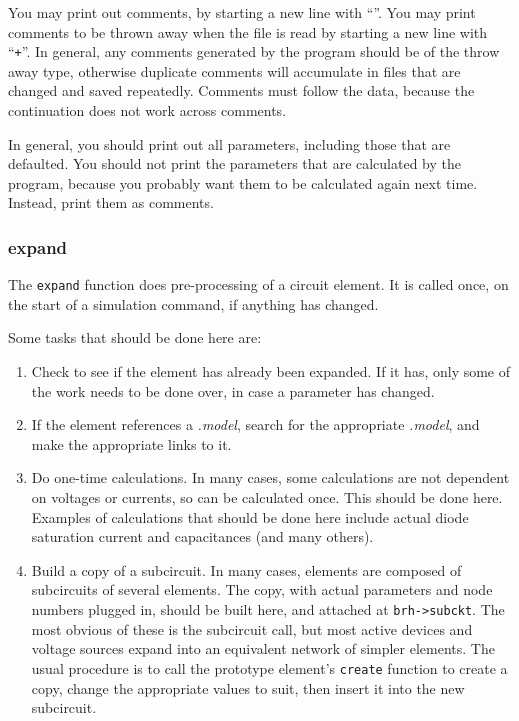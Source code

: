You may print out comments, by starting a new line with ``{\tt *}''.  You
may print comments to be thrown away when the file is read by starting a new
line with ``{\tt *+}''.  In general, any comments generated by the program
should be of the throw away type, otherwise duplicate comments will
accumulate in files that are changed and saved repeatedly.  Comments must
follow the data, because the continuation does not work across comments.

In general, you should print out all parameters, including those that are
defaulted.  You should not print the parameters that are calculated by the
program, because you probably want them to be calculated again next time.
Instead, print them as comments.
\subsubsection{expand}

The {\tt expand} function does pre-processing of a circuit element.  It is
called once, on the start of a simulation command, if anything has changed.

Some tasks that should be done here are:

\begin{enumerate}

\item Check to see if the element has already been expanded.  If it has,
only some of the work needs to be done over, in case a parameter has changed.

\item If the element references a {\em .model}, search for the appropriate
{\em .model}, and make the appropriate links to it.

\item Do one-time calculations.  In many cases, some calculations are not
dependent on voltages or currents, so can be calculated once.  This should
be done here.  Examples of calculations that should be done here include
actual diode saturation current and capacitances (and many others).

\item Build a copy of a subcircuit.  In many cases, elements are composed of
subcircuits of several elements.  The copy, with actual parameters and node
numbers plugged in, should be built here, and attached at {\tt brh->subckt}.
The most obvious of these is the subcircuit call, but most active devices
and voltage sources expand into an equivalent network of simpler elements.
The usual procedure is to call the prototype element's {\tt create} function
to create a copy, change the appropriate values to suit, then insert it into
the new subcircuit.

\end{enumerate}

